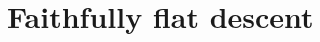 \documentclass[../main.tex]{subfiles}
\begin{document}
\setcounter{chapter}{7}
\chapter{Faithfully flat descent}
\end{document}
